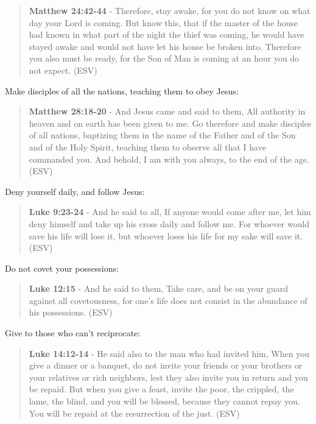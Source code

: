 \documentclass[11pt]{article}
\begin{document}
\begin{quote}
\textbf{Matthew 24:42-44} - Therefore, stay awake, for you do not know on what day your Lord is coming. But know this, that if the master of the house had known in what part of the night the thief was coming, he would have stayed awake and would not have let his house be broken into. Therefore you also must be ready, for the Son of Man is coming at an hour you do not expect. (ESV)
\end{quote}

Make disciples of all the nations, teaching them to obey Jesus:
\begin{quote}
\textbf{Matthew 28:18-20} - And Jesus came and said to them, All authority in heaven and on earth has been given to me. Go therefore and make disciples of all nations, baptizing them in the name of the Father and of the Son and of the Holy Spirit, teaching them to observe all that I have commanded you. And behold, I am with you always, to the end of the age. (ESV)
\end{quote}

Deny yourself daily, and follow Jesus:

\begin{quote}
\textbf{Luke 9:23-24} - And he said to all, If anyone would come after me, let him deny himself and take up his cross daily and follow me. For whoever would save his life will lose it, but whoever loses his life for my sake will save it. (ESV)
\end{quote}

Do not covet your possessions:

\begin{quote}
\textbf{Luke 12:15} - And he said to them, Take care, and be on your guard against all covetousness, for one's life does not consist in the abundance of his possessions. (ESV)
\end{quote}

Give to those who can't reciprocate:

\begin{quote}
\textbf{Luke 14:12-14} - He said also to the man who had invited him, When you give a dinner or a banquet, do not invite your friends or your brothers or your relatives or rich neighbors, lest they also invite you in return and you be repaid. But when you give a feast, invite the poor, the crippled, the lame, the blind, and you will be blessed, because they cannot repay you. You will be repaid at the resurrection of the just. (ESV)
\end{quote}
\end{document}
